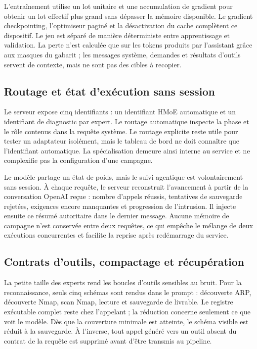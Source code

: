 L'entraînement utilise un lot unitaire et une accumulation de gradient pour
obtenir un lot effectif plus grand sans dépasser la mémoire disponible. Le
gradient checkpointing, l'optimiseur paginé et la désactivation du cache
complètent ce dispositif. Le jeu est séparé de manière déterministe entre
apprentissage et validation. La perte n'est calculée que sur les tokens produits
par l'assistant grâce aux masques du gabarit ; les messages système, demandes et
résultats d'outils servent de contexte, mais ne sont pas des cibles à recopier.


\subsection{Routage et état d'exécution sans session}

Le serveur expose cinq identifiants : un identifiant HMoE automatique et un
identifiant de diagnostic par expert. Le routage automatique inspecte la phase
et le rôle contenus dans la requête système. Le routage explicite reste utile
pour tester un adaptateur isolément, mais le tableau de bord ne doit connaître
que l'identifiant automatique. La spécialisation demeure ainsi interne au
service et ne complexifie pas la configuration d'une campagne.

Le modèle partage un état de poids, mais le suivi agentique est volontairement
sans session. À chaque requête, le serveur reconstruit l'avancement à partir de
la conversation OpenAI reçue : nombre d'appels réussis, tentatives de sauvegarde
rejetées, exigences encore manquantes et progression de l'intrusion. Il injecte
ensuite ce résumé autoritaire dans le dernier message. Aucune mémoire de campagne
n'est conservée entre deux requêtes, ce qui empêche le mélange de deux exécutions
concurrentes et facilite la reprise après redémarrage du service.

\subsection{Contrats d'outils, compactage et récupération}

La petite taille des experts rend les boucles d'outils sensibles au bruit. Pour
la reconnaissance, seuls cinq schémas sont rendus dans le prompt : découverte
ARP, découverte Nmap, scan Nmap, lecture et sauvegarde de livrable. Le registre
exécutable complet reste chez l'appelant ; la réduction concerne seulement ce
que voit le modèle. Dès que la couverture minimale est atteinte, le schéma visible
est réduit à la sauvegarde. À l'inverse, tout appel généré vers un outil absent
du contrat de la requête est supprimé avant d'être transmis au pipeline.

